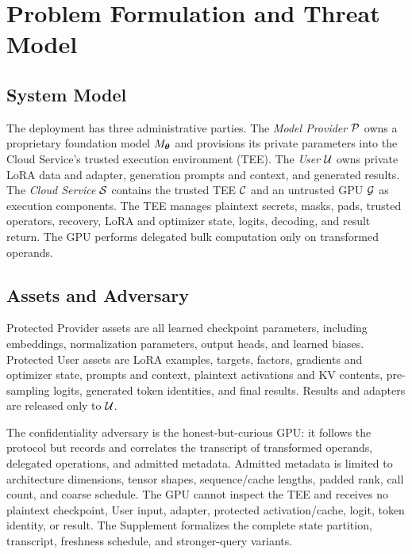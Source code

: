 \section{Problem Formulation and Threat Model}
\label{sec:threat}

\subsection{System Model}
\label{subsec:system}

The deployment has three administrative parties. The \emph{Model Provider}
$\mathcal{P}$ owns a proprietary foundation model $M_{\boldsymbol{\theta}}$ and provisions its
private parameters into the Cloud Service's trusted execution environment
(TEE). The \emph{User} $\mathcal{U}$ owns private LoRA data and adapter, generation
prompts and context, and generated results. The \emph{Cloud Service} $\mathcal{S}$
contains the trusted TEE $\mathcal{C}$ and an untrusted GPU $\mathcal{G}$ as execution
components. The TEE manages plaintext secrets, masks, pads, trusted operators,
recovery, LoRA and optimizer state, logits, decoding, and result return. The GPU
performs delegated bulk computation only on transformed operands.

\subsection{Assets and Adversary}
\label{subsec:attacker}

Protected Provider assets are all learned checkpoint parameters, including
embeddings, normalization parameters, output heads, and learned biases.
Protected User assets are LoRA examples, targets, factors, gradients and
optimizer state, prompts and context, plaintext activations and KV contents,
pre-sampling logits, generated token identities, and final results. Results and
adapters are released only to $\mathcal{U}$.

The confidentiality adversary is the honest-but-curious GPU: it follows the
protocol but records and correlates the transcript of transformed operands,
delegated operations, and admitted metadata. Admitted metadata is limited to
architecture dimensions, tensor shapes, sequence/cache lengths, padded rank,
call count, and coarse schedule. The GPU cannot inspect the TEE and receives no
plaintext checkpoint, User input, adapter, protected activation/cache, logit,
token identity, or result. The Supplement formalizes the complete state
partition, transcript, freshness schedule, and stronger-query variants.

